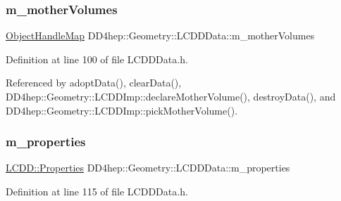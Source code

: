 \hypertarget{class_d_d4hep_1_1_geometry_1_1_l_c_d_d_data_a3d9a2d83bdb9c5784b51439c857f7f5f}{}\label{class_d_d4hep_1_1_geometry_1_1_l_c_d_d_data_a3d9a2d83bdb9c5784b51439c857f7f5f} 
\subsubsection{\texorpdfstring{m\+\_\+mother\+Volumes}{m\_motherVolumes}}
{\footnotesize\ttfamily \hyperlink{class_d_d4hep_1_1_geometry_1_1_l_c_d_d_data_1_1_object_handle_map}{Object\+Handle\+Map} D\+D4hep\+::\+Geometry\+::\+L\+C\+D\+D\+Data\+::m\+\_\+mother\+Volumes\hspace{0.3cm}{\ttfamily [protected]}}



Definition at line 100 of file L\+C\+D\+D\+Data.\+h.



Referenced by adopt\+Data(), clear\+Data(), D\+D4hep\+::\+Geometry\+::\+L\+C\+D\+D\+Imp\+::declare\+Mother\+Volume(), destroy\+Data(), and D\+D4hep\+::\+Geometry\+::\+L\+C\+D\+D\+Imp\+::pick\+Mother\+Volume().

\hypertarget{class_d_d4hep_1_1_geometry_1_1_l_c_d_d_data_a5dd25d2999fe2c6687c41fb4871aac21}{}\label{class_d_d4hep_1_1_geometry_1_1_l_c_d_d_data_a5dd25d2999fe2c6687c41fb4871aac21} 
\subsubsection{\texorpdfstring{m\+\_\+properties}{m\_properties}}
{\footnotesize\ttfamily \hyperlink{class_d_d4hep_1_1_geometry_1_1_l_c_d_d_a89096744868821bf5dcb0c0560b348c9}{L\+C\+D\+D\+::\+Properties} D\+D4hep\+::\+Geometry\+::\+L\+C\+D\+D\+Data\+::m\+\_\+properties\hspace{0.3cm}{\ttfamily [protected]}}



Definition at line 115 of file L\+C\+D\+D\+Data.\+h.



